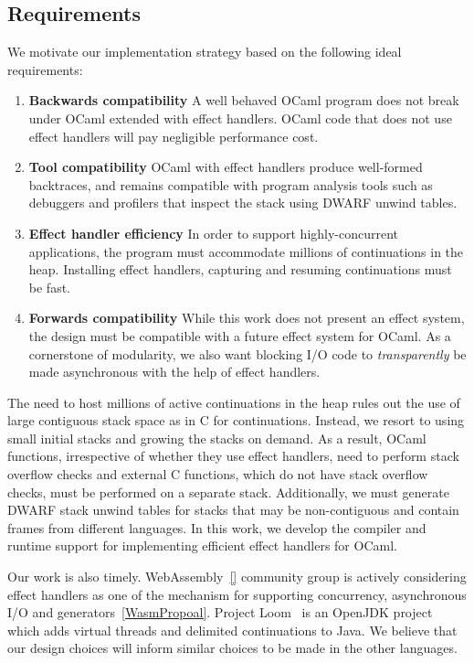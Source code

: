 \documentclass[sigplan,10pt,review,anonymous]{acmart}\settopmatter{printfolios=true,printccs=false,printacmref=false}
\begin{document}
\subsection{Requirements}
\label{sec:requirements}

We motivate our implementation strategy based on the following ideal
requirements:

\begin{enumerate}[label=R\arabic*]
	\item \textbf{Backwards compatibility} A well behaved OCaml program does not
		break under OCaml extended with effect handlers. OCaml code that does not
		use effect handlers will pay negligible performance cost.
	\item \textbf{Tool compatibility} OCaml with effect handlers produce
		well-formed backtraces, and remains compatible with program analysis tools
		such as debuggers and profilers that inspect the stack using DWARF unwind
		tables.
	\item \textbf{Effect handler efficiency} In order to support
		highly-concurrent applications, the program must accommodate millions of
		continuations in the heap. Installing effect handlers, capturing and
		resuming continuations must be fast.
	\item \textbf{Forwards compatibility} While this work does not present an
		effect system, the design must be compatible with a future effect system
		for OCaml. As a cornerstone of modularity, we also want blocking I/O code
		to \emph{transparently} be made asynchronous with the help of effect
		handlers.
\end{enumerate}

The need to host millions of active continuations in the heap rules out the use
of large contiguous stack space as in C for continuations. Instead, we resort
to using small initial stacks and growing the stacks on demand. As a result,
OCaml functions, irrespective of whether they use effect handlers, need to
perform stack overflow checks and external C functions, which do not have stack
overflow checks, must be performed on a separate stack. Additionally, we must
generate DWARF stack unwind tables for stacks that may be non-contiguous and
contain frames from different languages. In this work, we develop the compiler
and runtime support for implementing efficient effect handlers for OCaml.

Our work is also timely. WebAssembly~\ref{} community group is actively
considering effect handlers as one of the mechanism for supporting concurrency,
asynchronous I/O and generators~\ref{WasmPropoal}. Project Loom~\cite{} is an
OpenJDK project which adds virtual threads and delimited continuations to Java.
We believe that our design choices will inform similar choices to be made in
the other languages.
\end{document}
